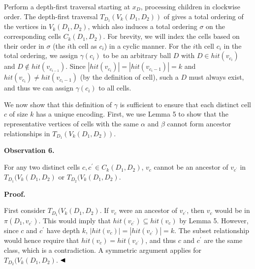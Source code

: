 \documentclass[10pt,a4paper]{article}
\begin{document}
\par
\par
Perform a depth-first traversal starting at $x_{D}$, processing children in clockwise order. The depth-first traversal $T_{D_{1}}(V_{k}(D_{1},D_{2}))$ of gives a total ordering of the vertices in $V_{k}(D_{1},D_{2})$, which also induces a total ordering $\sigma$ on the corresponding cells $C_{k}(D_{1},D_{2})$. For brevity, we will index the cells based on their order in $\sigma$ (the $i$th cell as $c_{i}$) in a cyclic manner. For the $i$th cell $c_{i}$ in the total ordering, we assign $\gamma(c_{i})$ to be an arbitrary ball $D$ with $D\in\mathit{hit}(v_{c_{i}})$ and $D\not\in\mathit{hit}(v_{c_{i-1}})$. Since $|\mathit{hit}(v_{c_{i}})|=|\mathit{hit}(v_{c_{i}-1})|=k$ and $\mathit{hit}(v_{c_{i}})\neq\mathit{hit}(v_{c_{i}-1})$ (by the definition of cell), such a $D$ must always exist, and thus we can assign $\gamma(c_{i})$ to all cells.
\par
\par
We now show that this definition of $\gamma$ is sufficient to ensure that each distinct cell $c$ of size $k$ has a unique encoding. First, we use Lemma 5 to show that the representative vertices of cells with the same $\alpha$ and $\beta$ cannot form ancestor relationships in $T_{D_{1}}(V_{k}(D_{1},D_{2}))$.
\par
\par
\par\medskip\noindent\textbf{Observation 6.}\par
For any two distinct cells $c,c^{\prime}\in C_{k}(D_{1},D_{2})$, $v_{c}$ cannot be an ancestor of $v_{c^{\prime}}$ in $T_{D_{1}}(V_{k}(D_{1},D_{2})$ or $T_{D_{2}}(V_{k}(D_{1},D_{2})$.
\par
\par
\par
\par\medskip\noindent\textbf{Proof.}\par
First consider $T_{D_{1}}(V_{k}(D_{1},D_{2})$. If $v_{c}$ were an ancestor of $v_{c^{\prime}}$, then $v_{c}$ would be in $\pi(D_{1},v_{c^{\prime}})$. This would imply that $\mathit{hit}(v_{c^{\prime}})\subseteq\mathit{hit}(v_{c})$ by Lemma 5. However, since $c$ and $c^{\prime}$ have depth $k$, $|\mathit{hit}(v_{c})|=|\mathit{hit}(v_{c^{\prime}})|=k$. The subset relationship would hence require that $\mathit{hit}(v_{c})=\mathit{hit}(v_{c^{\prime}})$, and thus $c$ and $c^{\prime}$ are the same class, which is a contradiction. A symmetric argument applies for $T_{D_{2}}(V_{k}(D_{1},D_{2})$. $\hfill\blacktriangleleft$
\end{document}
